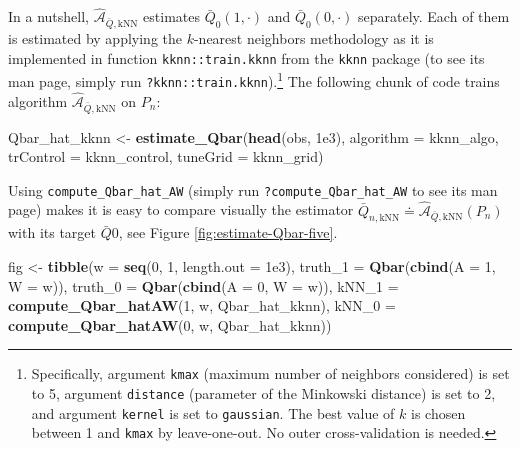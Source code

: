 \documentclass[11pt,openright,twoside]{book}
\newenvironment{Shaded}{\begin{snugshade}}{\end{snugshade}}
\newcommand{\DataTypeTok}[1]{\textcolor[rgb]{0.13,0.29,0.53}{#1}}
\newcommand{\DecValTok}[1]{\textcolor[rgb]{0.00,0.00,0.81}{#1}}
\newcommand{\FloatTok}[1]{\textcolor[rgb]{0.00,0.00,0.81}{#1}}
\newcommand{\KeywordTok}[1]{\textcolor[rgb]{0.13,0.29,0.53}{\textbf{#1}}}
\newcommand{\NormalTok}[1]{#1}
\newcommand{\StringTok}[1]{\textcolor[rgb]{0.31,0.60,0.02}{#1}}
\newcommand{\Algo}{\widehat{\mathcal{A}}}
\newcommand{\defq}{\doteq}
\newcommand{\Qbar}{\bar{Q}}
\theoremstyle{definition}
\theoremstyle{definition}
\theoremstyle{definition}
\theoremstyle{remark}
\begin{document}
In a nutshell, \(\Algo_{\Qbar,\text{kNN}}\) estimates \(\Qbar_{0}(1,\cdot)\) and
\(\Qbar_{0}(0,\cdot)\) separately. Each of them is estimated by applying the
\(k\)-nearest neighbors methodology as it is implemented in function
\texttt{kknn::train.kknn} from the \texttt{kknn} package (to see its man page, simply run
\texttt{?kknn::train.kknn}).\footnote{Specifically, argument \texttt{kmax} (maximum number of
  neighbors considered) is set to 5, argument \texttt{distance} (parameter of the
  Minkowski distance) is set to 2, and argument \texttt{kernel} is set to \texttt{gaussian}.
  The best value of \(k\) is chosen between 1 and \texttt{kmax} by leave-one-out. No
  outer cross-validation is needed.} The following chunk of code trains
algorithm \(\Algo_{\Qbar,\text{kNN}}\) on \(P_{n}\):

\begin{Shaded}
\begin{Highlighting}[]
\NormalTok{Qbar_hat_kknn <-}\StringTok{ }\KeywordTok{estimate_Qbar}\NormalTok{(}\KeywordTok{head}\NormalTok{(obs, }\FloatTok{1e3}\NormalTok{),}
                               \DataTypeTok{algorithm =}\NormalTok{ kknn_algo,}
                               \DataTypeTok{trControl =}\NormalTok{ kknn_control,}
                               \DataTypeTok{tuneGrid =}\NormalTok{ kknn_grid)}
\end{Highlighting}
\end{Shaded}

Using \texttt{compute\_Qbar\_hat\_AW} (simply run \texttt{?compute\_Qbar\_hat\_AW} to see its man
page) makes it is easy to compare visually the estimator \(\Qbar_{n,\text{kNN}} \defq \Algo_{\Qbar,\text{kNN}}(P_{n})\) with its target \(\Qbar0\), see Figure
\ref{fig:estimate-Qbar-five}.

\begin{Shaded}
\begin{Highlighting}[]
\NormalTok{fig <-}\StringTok{ }\KeywordTok{tibble}\NormalTok{(}\DataTypeTok{w =} \KeywordTok{seq}\NormalTok{(}\DecValTok{0}\NormalTok{, }\DecValTok{1}\NormalTok{, }\DataTypeTok{length.out =} \FloatTok{1e3}\NormalTok{),}
              \DataTypeTok{truth_1 =} \KeywordTok{Qbar}\NormalTok{(}\KeywordTok{cbind}\NormalTok{(}\DataTypeTok{A =} \DecValTok{1}\NormalTok{, }\DataTypeTok{W =}\NormalTok{ w)),}
              \DataTypeTok{truth_0 =} \KeywordTok{Qbar}\NormalTok{(}\KeywordTok{cbind}\NormalTok{(}\DataTypeTok{A =} \DecValTok{0}\NormalTok{, }\DataTypeTok{W =}\NormalTok{ w)),}
              \DataTypeTok{kNN_1 =} \KeywordTok{compute_Qbar_hatAW}\NormalTok{(}\DecValTok{1}\NormalTok{, w, Qbar_hat_kknn),}
              \DataTypeTok{kNN_0 =} \KeywordTok{compute_Qbar_hatAW}\NormalTok{(}\DecValTok{0}\NormalTok{, w, Qbar_hat_kknn))}
\end{Highlighting}
\end{Shaded}
\end{document}
